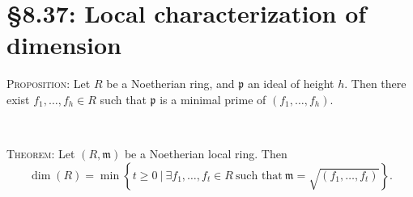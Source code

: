 \documentclass[12pt]{amsart}
\newcommand{\m}{\mathfrak{m}}
\newcommand{\p}{\mathfrak{p}}
\renewcommand{\1}{\mathbbm{1}}
\newcommand{\showsol}[1]{\def\displaysol{#1}}
\begin{document}
\showsol{1}
	
	\thispagestyle{empty}
	
	\section*{\S8.37: Local characterization of dimension}
	
	\begin{framed}
		\noindent	 \textsc{Proposition:} Let $R$ be a Noetherian ring, and $\p$ an ideal of height $h$. Then there exist $f_1,\dots,f_h\in R$ such that $\p$ is a minimal prime of $(f_1,\dots,f_h)$.
	
	\
	
		\noindent	 \textsc{Theorem:}  Let $(R,\m)$ be a Noetherian local ring. Then 
		\[ \dim(R) = \min\left\{ t\geq 0 \ \big| \ \exists f_1,\dots,f_t\in R \ \text{such that} \ \m = \sqrt{(f_1,\dots,f_t)}\right\}.\]


		\end{framed}
\end{document}
